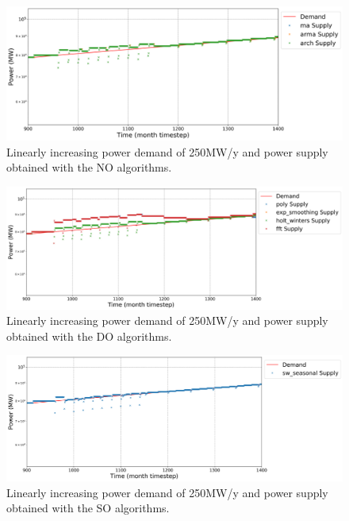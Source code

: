 \documentclass[11pt]{article}
\begin{document}
\begin{figure}[H]
	\centering
	\includegraphics[width=\textwidth]{24-figures/lin-24-power-buffer01.png} 
	\hfill
	\caption{Linearly increasing power demand of 250MW/y and power supply obtained with the NO algorithms.}
	\label{fig:24-lin-NO}
\end{figure}

\begin{figure}[H]
	\centering
	\includegraphics[width=\textwidth]{24-figures/lin-24-power-buffer02.png} 
	\hfill
	\caption{Linearly increasing power demand of 250MW/y and power supply obtained with the DO algorithms.}
	\label{fig:24-lin-DO}
\end{figure}

\begin{figure}[H]
	\centering
	\includegraphics[width=\textwidth]{24-figures/lin-24-power-buffer03.png} 
	\hfill
	\caption{Linearly increasing power demand of 250MW/y and power supply obtained with the SO algorithms.}
	\label{fig:24-lin-SO}
\end{figure}
\end{document}

